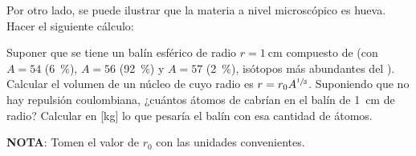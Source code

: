 \documentclass[../main]{subfiles}
\begin{document}
    \begin{exercise}
        Por otro lado, se puede ilustrar que la materia a nivel microscópico es hueva. Hacer el siguiente cálculo:

        Suponer que se tiene un balín esférico de radio \(r = \SI{1}{\cm}\) compuesto de  (con \(A = 54\) (\SI{6}{\percent}), \(A = 56\) (\SI{92}{\percent}) y \(A = 57\) (\SI{2}{\percent}), isótopos más abundantes del ). Calcular el volumen de un núcleo de  cuyo radio es \(r = r_{0}A^{\sfrac{1}{3}}\). Suponiendo que no hay repulsión coulombiana, ¿cuántos átomos de  cabrían en el balín de \SI{1}{\cm} de radio? Calcular en [\unit{\kg}] lo que pesaría el balín con esa cantidad de átomos.

        \textbf{NOTA}: Tomen el valor de \(r_{0}\) con las unidades convenientes.

        \begin{solution}
            
        \end{solution}
    \end{exercise}
\end{document}

